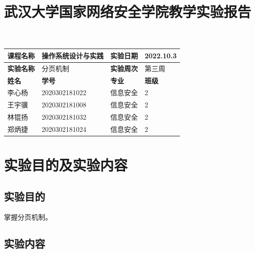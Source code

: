 \documentclass[UTF8,12pt]{ctexart}
\title{\vspace{-1.9cm}\textbf{武汉大学国家网络安全学院教学实验报告}}
\date{\vspace{-2.5cm}}
\begin{document}
    \maketitle
    \thispagestyle{fancy}
    
    \begin{table}[H]
    \centering
    \begin{tabular}{|p{2.5cm}<{\centering}|p{4.5cm}<{\centering}|p{3cm}<{\centering}|p{2.5cm}<{\centering}|}
    \hline
    \textbf{课程名称} & 操作系统设计与实践     & \textbf{实验日期} & 2022.10.3   \\ \hline
    \textbf{实验名称} & 分页机制          & \textbf{实验周次} & 第三周         \\ \hline
    \textbf{姓名}   & \textbf{学号}   & \textbf{专业}   & \textbf{班级} \\ \hline
    李心杨 & 2020302181022 & 信息安全   & 2    \\ \hline
    王宇骥 & 2020302181008 & 信息安全   & 2    \\ \hline
    林锟扬  & 2020302181032 & 信息安全 & 2     \\ \hline
    郑炳捷 & 2020302181024 & 信息安全 & 2     \\ \hline
    \end{tabular}
    \end{table}
    
    \section{实验目的及实验内容}
    \subsection{实验目的}
    掌握分页机制。
    
    \subsection{实验内容}
    
\end{document}
